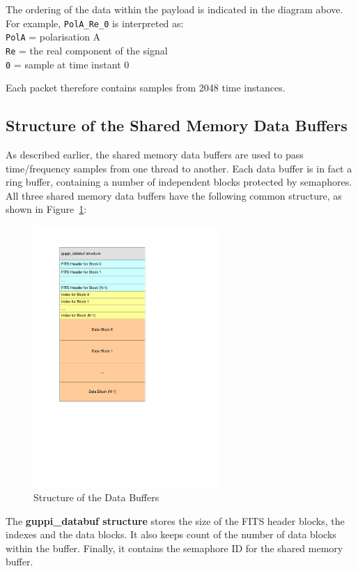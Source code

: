 \documentclass[11pt]{article} %
\begin{document}
The ordering of the data within the payload is indicated in the diagram above. For example, \texttt{PolA\_Re\_0} is interpreted as: \\
\texttt{PolA} = polarisation A \\
\texttt{Re} = the real component of the signal \\
\texttt{0} = sample at time instant 0

Each packet therefore contains samples from 2048 time instances.

\subsection{Structure of the Shared Memory Data Buffers}
\label{data-buffer-section}

As described earlier, the shared memory data buffers are used to pass time/frequency samples from one thread to another. Each data buffer is in fact a ring buffer, containing a number of independent blocks protected by semaphores. All three shared memory data buffers have the following common structure, as shown in Figure~\ref{vegas-buffer}:

\begin{figure}[!ht]
\centering
\includegraphics*[width=7cm, viewport = 80 270 360 780]{figures/vegas-buffer.pdf}
\caption{Structure of the Data Buffers}
\label{vegas-buffer}
\end{figure}

The {\bf guppi\_databuf structure} stores the size of the FITS header blocks, the indexes and the data blocks. It also keeps count of the number of data blocks within the buffer. Finally, it contains the semaphore ID for the shared memory buffer.
\end{document}
